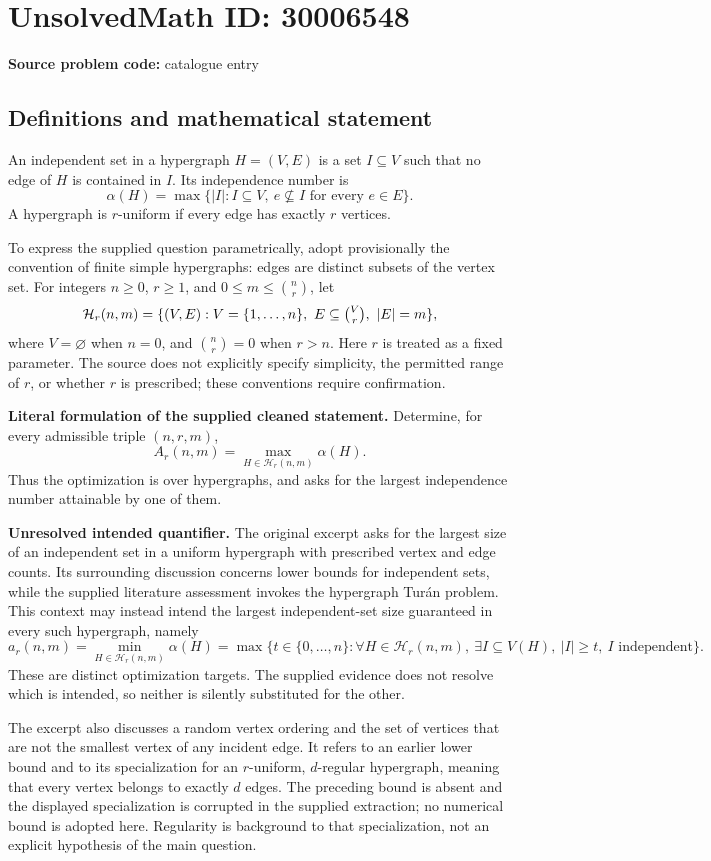 \documentclass[11pt]{article}
\begin{document}
\section*{UnsolvedMath ID: 30006548}
\textbf{Source problem code:} catalogue entry
\subsection{Definitions and mathematical statement}
An independent set in a hypergraph \(H=(V,E)\) is a set \(I\subseteq V\) such that no edge of \(H\) is contained in \(I\). Its independence number is
\[
\alpha(H)=\max\{\lvert I\rvert:I\subseteq V,\ e\nsubseteq I\text{ for every }e\in E\}.
\]
A hypergraph is \(r\)-uniform if every edge has exactly \(r\) vertices.

To express the supplied question parametrically, adopt provisionally the convention of finite simple hypergraphs: edges are distinct subsets of the vertex set. For integers \(n\geq 0\), \(r\geq 1\), and \(0\leq m\leq\binom nr\), let
\[
\mathcal H_r(n,m)=\{(V,E):V=\{1,\ldots,n\},\ E\subseteq\tbinom Vr,\ |E|=m\},
\]
where \(V=\varnothing\) when \(n=0\), and \(\binom nr=0\) when \(r>n\). Here \(r\) is treated as a fixed parameter. The source does not explicitly specify simplicity, the permitted range of \(r\), or whether \(r\) is prescribed; these conventions require confirmation.

\textbf{Literal formulation of the supplied cleaned statement.} Determine, for every admissible triple \((n,r,m)\),
\[
A_r(n,m)=\max_{H\in\mathcal H_r(n,m)}\alpha(H).
\]
Thus the optimization is over hypergraphs, and asks for the largest independence number attainable by one of them.

\textbf{Unresolved intended quantifier.} The original excerpt asks for the largest size of an independent set in a uniform hypergraph with prescribed vertex and edge counts. Its surrounding discussion concerns lower bounds for independent sets, while the supplied literature assessment invokes the hypergraph Tur\'an problem. This context may instead intend the largest independent-set size guaranteed in every such hypergraph, namely
\[
a_r(n,m)=\min_{H\in\mathcal H_r(n,m)}\alpha(H)
=\max\{t\in\{0,\ldots,n\}:\forall H\in\mathcal H_r(n,m),\ \exists I\subseteq V(H),\ |I|\geq t,\ I\text{ independent}\}.
\]
These are distinct optimization targets. The supplied evidence does not resolve which is intended, so neither is silently substituted for the other.

The excerpt also discusses a random vertex ordering and the set of vertices that are not the smallest vertex of any incident edge. It refers to an earlier lower bound and to its specialization for an \(r\)-uniform, \(d\)-regular hypergraph, meaning that every vertex belongs to exactly \(d\) edges. The preceding bound is absent and the displayed specialization is corrupted in the supplied extraction; no numerical bound is adopted here. Regularity is background to that specialization, not an explicit hypothesis of the main question.
\end{document}
